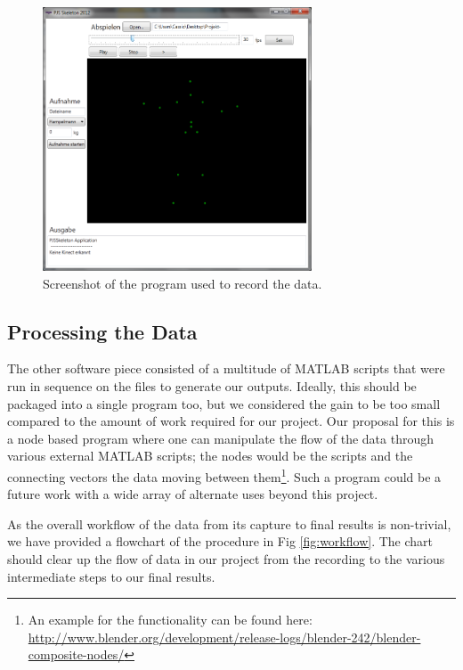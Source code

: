 \documentclass[a4paper]{article}
\begin{document}
\begin{figure}
	\centering
	\includegraphics[width=8cm]{programm.jpg}
	\caption{Screenshot of the program used to record the data.}
	\label{fig:programm}
\end{figure}



\subsection{Processing the Data}

The other software piece consisted of a multitude of MATLAB\cite{matlabprograms} scripts that were run in sequence on the files to generate our outputs.
Ideally, this should be packaged into a single program too, but we considered the gain to be too small compared to the amount of work required for our project.
Our proposal for this is a node based program where one can manipulate the flow of the data through various external MATLAB scripts; the nodes would be the scripts and the connecting vectors the data moving between them\footnote{An example for the functionality can be found here: \url{http://www.blender.org/development/release-logs/blender-242/blender-composite-nodes/}}.
Such a program could be a future work with a wide array of alternate uses beyond this project.

As the overall workflow of the data from its capture to final results is non-trivial, we have provided a flowchart of the procedure in Fig \ref{fig:workflow}.
The chart should clear up the flow of data in our project from the recording to the various intermediate steps to our final results.
\end{document}
